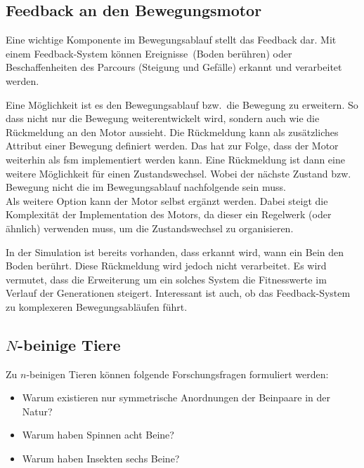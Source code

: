     \subsection{Feedback an den Bewegungsmotor\label{sub:PerspectiveFeedback}}

      Eine wichtige Komponente im Bewegungsablauf stellt das Feedback dar.
      Mit einem Feedback-System können Ereignisse~(Boden berühren) oder
      Beschaffenheiten des Parcours (Steigung und Gefälle) erkannt und verarbeitet werden.

      \medskip

      Eine Möglichkeit ist es den Bewegungsablauf bzw.\ die Bewegung zu erweitern.
      So dass nicht nur die Bewegung weiterentwickelt wird, sondern auch wie die Rückmeldung an den Motor aussieht.
      Die Rückmeldung kann als zusätzliches Attribut einer Bewegung definiert werden.
      Das hat zur Folge, dass der Motor weiterhin als \acrshort{fsm} implementiert werden kann.
      Eine Rückmeldung ist dann eine weitere Möglichkeit für einen Zustandswechsel.
      Wobei der nächste Zustand bzw. Bewegung nicht die im Bewegungsablauf nachfolgende sein muss.
      \\
      Als weitere Option kann der Motor selbst ergänzt werden.
      Dabei steigt die Komplexität der Implementation des Motors,
      da dieser ein Regelwerk (oder ähnlich) verwenden muss, um die Zustandswechsel zu organisieren.

      \medskip

      In der Simulation ist bereits vorhanden, dass erkannt wird, wann ein Bein den Boden berührt.
      Diese Rückmeldung wird jedoch nicht verarbeitet. Es wird vermutet,
      dass die Erweiterung um ein solches System die Fitnesswerte im Verlauf der Generationen steigert.
      Interessant ist auch, ob das Feedback-System zu komplexeren Bewegungsabläufen führt.

    \subsection{\(N\)-beinige Tiere}

      Zu \(n\)-beinigen Tieren können folgende Forschungsfragen formuliert werden:

      \begin{itemize}

        \item Warum existieren nur symmetrische Anordnungen der Beinpaare in der Natur?

        \item Warum haben Spinnen acht Beine?

        \item Warum haben Insekten sechs Beine?

      \end{itemize}

